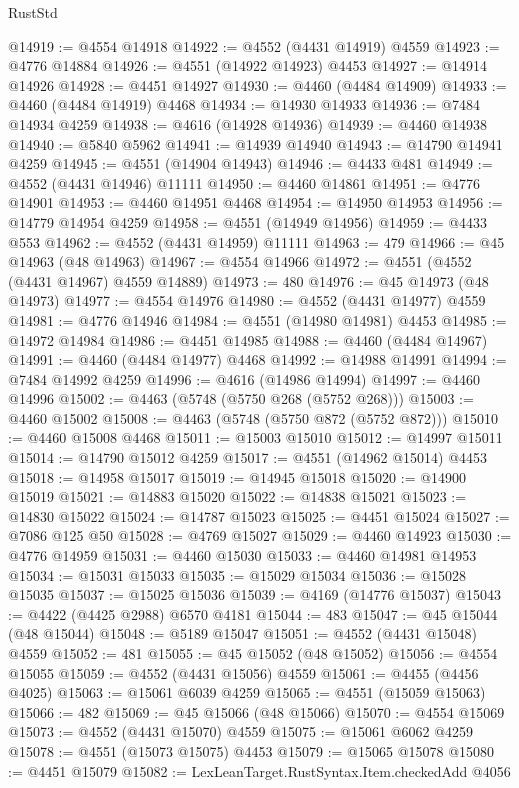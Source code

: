 \begin{lexlean}{RustStd}
\begin{coremodule}
@14919 := @4554 @14918
@14922 := @4552 (@4431 @14919) @4559
@14923 := @4776 @14884
@14926 := @4551 (@14922 @14923) @4453
@14927 := @14914 @14926
@14928 := @4451 @14927
@14930 := @4460 (@4484 @14909)
@14933 := @4460 (@4484 @14919) @4468
@14934 := @14930 @14933
@14936 := @7484 @14934 @4259
@14938 := @4616 (@14928 @14936)
@14939 := @4460 @14938
@14940 := @5840 @5962
@14941 := @14939 @14940
@14943 := @14790 @14941 @4259
@14945 := @4551 (@14904 @14943)
@14946 := @4433 @481
@14949 := @4552 (@4431 @14946) @11111
@14950 := @4460 @14861
@14951 := @4776 @14901
@14953 := @4460 @14951 @4468
@14954 := @14950 @14953
@14956 := @14779 @14954 @4259
@14958 := @4551 (@14949 @14956)
@14959 := @4433 @553
@14962 := @4552 (@4431 @14959) @11111
@14963 := 479
@14966 := @45 @14963 (@48 @14963)
@14967 := @4554 @14966
@14972 := @4551 (@4552 (@4431 @14967) @4559 @14889)
@14973 := 480
@14976 := @45 @14973 (@48 @14973)
@14977 := @4554 @14976
@14980 := @4552 (@4431 @14977) @4559
@14981 := @4776 @14946
@14984 := @4551 (@14980 @14981) @4453
@14985 := @14972 @14984
@14986 := @4451 @14985
@14988 := @4460 (@4484 @14967)
@14991 := @4460 (@4484 @14977) @4468
@14992 := @14988 @14991
@14994 := @7484 @14992 @4259
@14996 := @4616 (@14986 @14994)
@14997 := @4460 @14996
@15002 := @4463 (@5748 (@5750 @268 (@5752 @268)))
@15003 := @4460 @15002
@15008 := @4463 (@5748 (@5750 @872 (@5752 @872)))
@15010 := @4460 @15008 @4468
@15011 := @15003 @15010
@15012 := @14997 @15011
@15014 := @14790 @15012 @4259
@15017 := @4551 (@14962 @15014) @4453
@15018 := @14958 @15017
@15019 := @14945 @15018
@15020 := @14900 @15019
@15021 := @14883 @15020
@15022 := @14838 @15021
@15023 := @14830 @15022
@15024 := @14787 @15023
@15025 := @4451 @15024
@15027 := @7086 @125 @50
@15028 := @4769 @15027
@15029 := @4460 @14923
@15030 := @4776 @14959
@15031 := @4460 @15030
@15033 := @4460 @14981 @14953
@15034 := @15031 @15033
@15035 := @15029 @15034
@15036 := @15028 @15035
@15037 := @15025 @15036
@15039 := @4169 (@14776 @15037)
@15043 := @4422 (@4425 @2988) @6570 @4181
@15044 := 483
@15047 := @45 @15044 (@48 @15044)
@15048 := @5189 @15047
@15051 := @4552 (@4431 @15048) @4559
@15052 := 481
@15055 := @45 @15052 (@48 @15052)
@15056 := @4554 @15055
@15059 := @4552 (@4431 @15056) @4559
@15061 := @4455 (@4456 @4025)
@15063 := @15061 @6039 @4259
@15065 := @4551 (@15059 @15063)
@15066 := 482
@15069 := @45 @15066 (@48 @15066)
@15070 := @4554 @15069
@15073 := @4552 (@4431 @15070) @4559
@15075 := @15061 @6062 @4259
@15078 := @4551 (@15073 @15075) @4453
@15079 := @15065 @15078
@15080 := @4451 @15079
@15082 := LexLeanTarget.RustSyntax.Item.checkedAdd @4056

\end{coremodule}
\end{lexlean}
